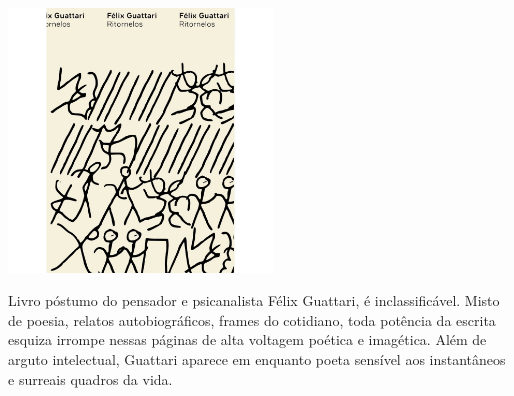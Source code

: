 \begin{center}
\hspace*{-.5cm}\includegraphics[width=70mm]{./grid/guattari.jpeg}
\end{center}

\hspace*{-7cm}\hrulefill\hspace*{-7cm}

\medskip

\noindent{}Livro póstumo do pensador e psicanalista Félix Guattari, {} é inclassificável. Misto de poesia, relatos autobiográficos, frames do cotidiano, toda potência da escrita esquiza irrompe nessas páginas de alta voltagem poética e imagética. Além de arguto intelectual, Guattari aparece em {} enquanto poeta sensível aos instantâneos e surreais quadros da vida.

\vfill

\hspace*{-.4cm}\begin{minipage}[c]{1\linewidth}
\small{
{}}
\end{minipage}

\pagebreak

\hspace{.5cm}

